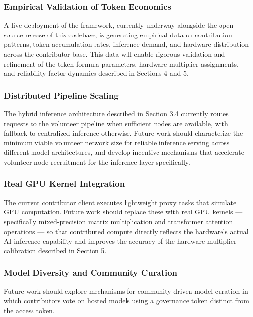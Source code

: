 \documentclass[12pt]{article}
\begin{document}
\subsubsection{Empirical Validation of Token Economics}

A live deployment of the framework, currently underway alongside the open-source release of this codebase, is generating empirical data on contribution patterns, token accumulation rates, inference demand, and hardware distribution across the contributor base. This data will enable rigorous validation and refinement of the token formula parameters, hardware multiplier assignments, and reliability factor dynamics described in Sections 4 and 5.

\subsubsection{Distributed Pipeline Scaling}

The hybrid inference architecture described in Section 3.4 currently routes requests to the volunteer pipeline when sufficient nodes are available, with fallback to centralized inference otherwise. Future work should characterize the minimum viable volunteer network size for reliable inference serving across different model architectures, and develop incentive mechanisms that accelerate volunteer node recruitment for the inference layer specifically.

\subsubsection{Real GPU Kernel Integration}

The current contributor client executes lightweight proxy tasks that simulate GPU computation. Future work should replace these with real GPU kernels — specifically mixed-precision matrix multiplication and transformer attention operations — so that contributed compute directly reflects the hardware's actual AI inference capability and improves the accuracy of the hardware multiplier calibration described in Section 5.

\subsubsection{Model Diversity and Community Curation}

Future work should explore mechanisms for community-driven model curation in which contributors vote on hosted models using a governance token distinct from the access token.
\end{document}
